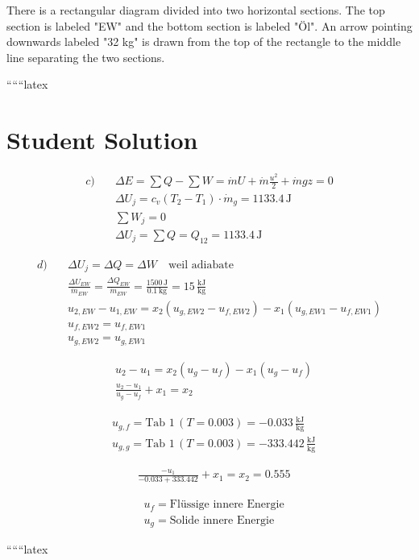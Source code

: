 There is a rectangular diagram divided into two horizontal sections. The top section is labeled "EW" and the bottom section is labeled "Öl". An arrow pointing downwards labeled "32 kg" is drawn from the top of the rectangle to the middle line separating the two sections.

``````latex


\section*{Student Solution}

\begin{align*}
c) \quad & \Delta E = \sum Q - \sum W = \dot{m} U + \dot{m} \frac{u^2}{2} + \dot{m} gz = 0 \\
& \Delta U_j = c_v (T_2 - T_1) \cdot \dot{m}_g = 1133.4 \, \text{J} \\
& \sum W_j = 0 \\
& \Delta U_j = \sum Q = Q_{12} = 1133.4 \, \text{J}
\end{align*}

\begin{align*}
d) \quad & \Delta U_j = \Delta Q = \Delta W \quad \text{weil adiabate} \\
& \frac{\Delta U_{EW}}{\dot{m}_{EW}} = \frac{\Delta Q_{EW}}{\dot{m}_{EW}} = \frac{1500 \, \text{J}}{0.1 \, \text{kg}} = 15 \, \frac{\text{kJ}}{\text{kg}} \\
& u_{2,EW} - u_{1,EW} = x_2 (u_{g,EW2} - u_{f,EW2}) - x_1 (u_{g,EW1} - u_{f,EW1}) \\
& u_{f,EW2} = u_{f,EW1} \\
& u_{g,EW2} = u_{g,EW1}
\end{align*}

\begin{align*}
& u_2 - u_1 = x_2 (u_g - u_f) - x_1 (u_g - u_f) \\
& \frac{u_2 - u_1}{u_g - u_f} + x_1 = x_2
\end{align*}

\begin{align*}
& u_{g,f} = \text{Tab 1} \, (T = 0.003) = -0.033 \, \frac{\text{kJ}}{\text{kg}} \\
& u_{g,g} = \text{Tab 1} \, (T = 0.003) = -333.442 \, \frac{\text{kJ}}{\text{kg}}
\end{align*}

\begin{align*}
& \frac{-u_1}{-0.033 + 333.442} + x_1 = x_2 = 0.555
\end{align*}

\begin{align*}
& u_f = \text{Flüssige innere Energie} \\
& u_g = \text{Solide innere Energie}
\end{align*}

``````latex


